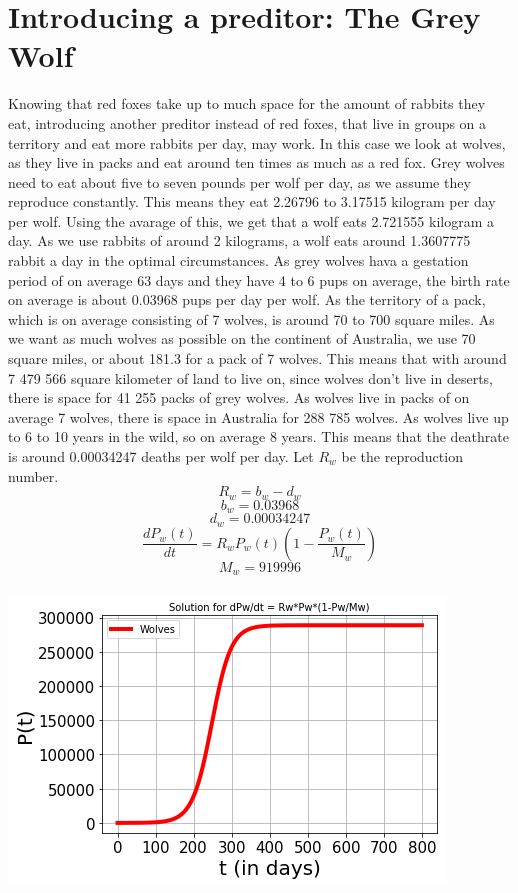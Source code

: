 \documentclass{article}
\begin{document}
\section{Introducing a preditor: The Grey Wolf}
Knowing that red foxes take up to much space for the amount of rabbits they eat, introducing another preditor instead of red foxes, that live in groups on a territory and eat more rabbits per day, may work. In this case we look at wolves, as they live in packs and eat around ten times as much as a red fox. Grey wolves need to eat about five to seven pounds per wolf per day, as we assume they reproduce constantly. This means they eat 2.26796 to 3.17515 kilogram per day per wolf. Using the avarage of this, we get that a wolf eats 2.721555 kilogram a day. As we use rabbits of around 2 kilograms, a wolf eats around 1.3607775 rabbit a day in the optimal circumstances. As grey wolves hava a gestation period of on average 63 days  and they have 4 to 6 pups on average, the birth rate on average is about 0.03968 pups per day per wolf. As the territory of a pack, which is on average consisting of 7 wolves, is around 70 to 700 square miles. As we want as much wolves as possible on the continent of Australia, we use 70 square miles, or about 181.3 for a pack of 7 wolves. This means that with around 7 479 566 square kilometer of land to live on, since wolves don't live in deserts, there is space for 41 255 packs of grey wolves. As wolves live in packs of on average 7 wolves, there is space in Australia for 288 785 wolves. As wolves live up to 6 to 10 years in the wild, so on average 8 years. This means that the deathrate is around 0.00034247 deaths per wolf per day. 
Let $R_w$ be the reproduction number.
$$R_w = b_w - d_w$$
$$b_w = 0.03968$$
$$d_w = 0.00034247$$
$$\frac{dP_w(t)}{dt} = R_wP_w(t)(1-\frac{P_w(t)}{M_w})$$
$$M_w = 919996$$
\\
\includegraphics[scale=0.78]{Pictures/Wolves.png}
\end{document}
